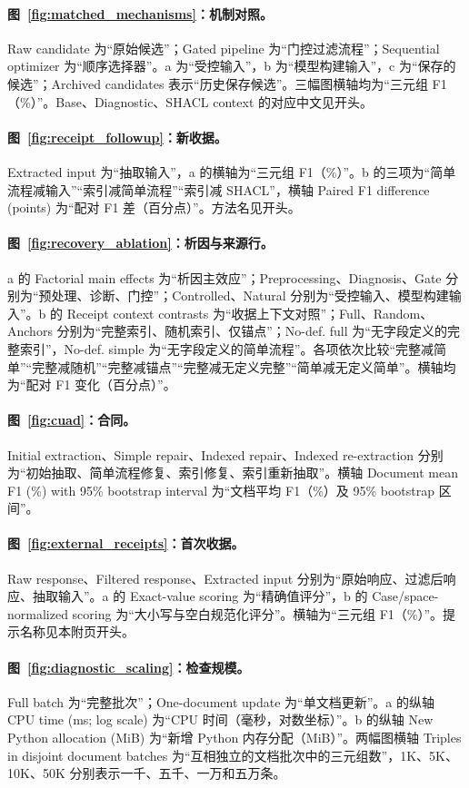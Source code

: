 \paragraph{图~\ref{fig:matched_mechanisms}：机制对照。}
Raw candidate 为“原始候选”；Gated pipeline 为“门控过滤流程”；Sequential optimizer 为“顺序选择器”。a 为“受控输入”，b 为“模型构建输入”，c 为“保存的候选”；Archived candidates 表示“历史保存候选”。三幅图横轴均为“三元组 F1（\%）”。Base、Diagnostic、SHACL context 的对应中文见开头。

\paragraph{图~\ref{fig:receipt_followup}：新收据。}
Extracted input 为“抽取输入”，a 的横轴为“三元组 F1（\%）”。b 的三项为“简单流程减输入”“索引减简单流程”“索引减 SHACL”，横轴 Paired F1 difference (points) 为“配对 F1 差（百分点）”。方法名见开头。

\paragraph{图~\ref{fig:recovery_ablation}：析因与来源行。}
a 的 Factorial main effects 为“析因主效应”；Preprocessing、Diagnosis、Gate 分别为“预处理、诊断、门控”；Controlled、Natural 分别为“受控输入、模型构建输入”。b 的 Receipt context contrasts 为“收据上下文对照”；Full、Random、Anchors 分别为“完整索引、随机索引、仅锚点”；No-def. full 为“无字段定义的完整索引”，No-def. simple 为“无字段定义的简单流程”。各项依次比较“完整减简单”“完整减随机”“完整减锚点”“完整减无定义完整”“简单减无定义简单”。横轴均为“配对 F1 变化（百分点）”。

\paragraph{图~\ref{fig:cuad}：合同。}
Initial extraction、Simple repair、Indexed repair、Indexed re-extraction 分别为“初始抽取、简单流程修复、索引修复、索引重新抽取”。横轴 Document mean F1 (\%) with 95\% bootstrap interval 为“文档平均 F1（\%）及 95\% bootstrap 区间”。

\paragraph{图~\ref{fig:external_receipts}：首次收据。}
Raw response、Filtered response、Extracted input 分别为“原始响应、过滤后响应、抽取输入”。a 的 Exact-value scoring 为“精确值评分”，b 的 Case/space-normalized scoring 为“大小写与空白规范化评分”。横轴为“三元组 F1（\%）”。提示名称见本附页开头。

\paragraph{图~\ref{fig:diagnostic_scaling}：检查规模。}
Full batch 为“完整批次”；One-document update 为“单文档更新”。a 的纵轴 CPU time (ms; log scale) 为“CPU 时间（毫秒，对数坐标）”。b 的纵轴 New Python allocation (MiB) 为“新增 Python 内存分配（MiB）”。两幅图横轴 Triples in disjoint document batches 为“互相独立的文档批次中的三元组数”，1K、5K、10K、50K 分别表示一千、五千、一万和五万条。
